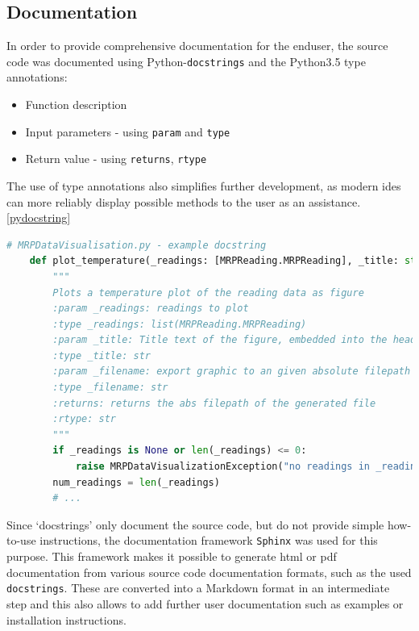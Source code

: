 \hypertarget{documentation}{%
\subsection{Documentation}\label{documentation}}

In order to provide comprehensive documentation for the enduser, the
source code was documented using
Python-\passthrough{\lstinline!docstrings!}\cite{PythonDocstringReference}
and the Python3.5 type annotations:

\begin{itemize}
\tightlist
\item
  Function description
\item
  Input parameters - using \passthrough{\lstinline!param!} and
  \passthrough{\lstinline!type!}
\item
  Return value - using \passthrough{\lstinline!returns!},
  \passthrough{\lstinline!rtype!}
\end{itemize}

The use of type annotations also simplifies further development, as
modern \gls{ide}s can more reliably display possible methods to the user
as an assistance.\ref{pydocstring}

\begin{lstlisting}[language=Python, caption={Python docstring example}, label=lst:pydocstring]
    # MRPDataVisualisation.py - example docstring
    def plot_temperature(_readings: [MRPReading.MRPReading], _title: str = '', _filename: str = None, _unit: str = "degree C") -> str:
        """
        Plots a temperature plot of the reading data as figure
        :param _readings: readings to plot
        :type _readings: list(MRPReading.MRPReading)
        :param _title: Title text of the figure, embedded into the head
        :type _title: str
        :param _filename: export graphic to an given absolute filepath with .png
        :type _filename: str
        :returns: returns the abs filepath of the generated file
        :rtype: str
        """
        if _readings is None or len(_readings) <= 0:
            raise MRPDataVisualizationException("no readings in _reading given")
        num_readings = len(_readings)
        # ...
\end{lstlisting}

Since `docstrings' only document the source code, but do not provide
simple how-to-use instructions, the documentation framework
\passthrough{\lstinline!Sphinx!}\cite{SphinxDocumentation} was used
for this purpose. This framework makes it possible to generate
\gls{html} or \gls{pdf} documentation from various source code
documentation formats, such as the used
\passthrough{\lstinline!docstrings!}. These are converted into a
Markdown format in an intermediate step and this also allows to add
further user documentation such as examples or installation
instructions.

